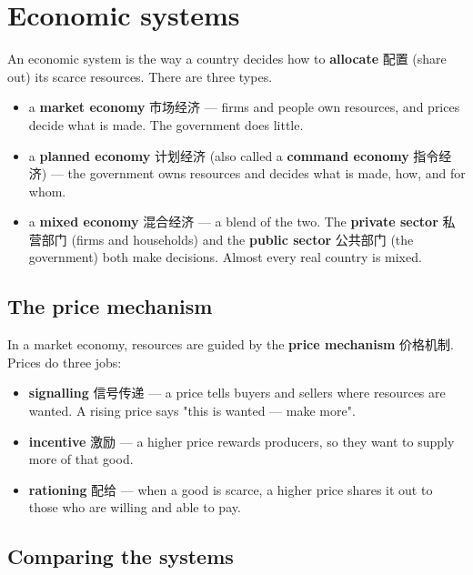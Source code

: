 \documentclass[11pt]{article}
\begin{document}
\section*{Economic systems}

An economic system is the way a country decides how to \textbf{allocate} 配置 (share out) its scarce resources. There are three types.

\begin{itemize}
\item a \textbf{market economy} 市场经济 — firms and people own resources, and prices decide what is made. The government does little.

\item a \textbf{planned economy} 计划经济 (also called a \textbf{command economy} 指令经济) — the government owns resources and decides what is made, how, and for whom.

\item a \textbf{mixed economy} 混合经济 — a blend of the two. The \textbf{private sector} 私营部门 (firms and households) and the \textbf{public sector} 公共部门 (the government) both make decisions. Almost every real country is mixed.

\end{itemize}

\subsection*{The price mechanism}

In a market economy, resources are guided by the \textbf{price mechanism} 价格机制. Prices do three jobs:

\begin{itemize}
\item \textbf{signalling} 信号传递 — a price tells buyers and sellers where resources are wanted. A rising price says "this is wanted — make more".

\item \textbf{incentive} 激励 — a higher price rewards producers, so they want to supply more of that good.

\item \textbf{rationing} 配给 — when a good is scarce, a higher price shares it out to those who are willing and able to pay.

\end{itemize}

\subsection*{Comparing the systems}
\end{document}
